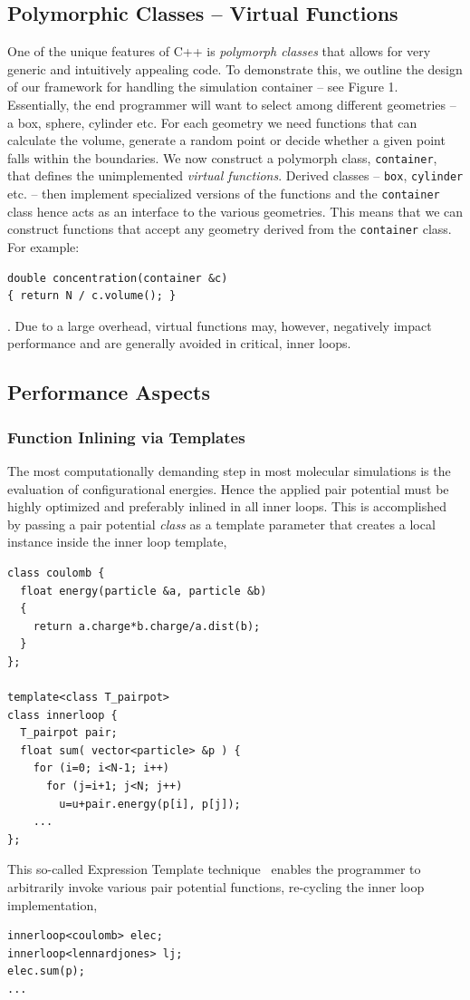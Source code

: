 \documentclass[10pt]{bmc_article}
\newenvironment{bmcformat}{\begin{raggedright}\baselineskip20pt\sloppy\setboolean{publ}{false}}{\end{raggedright}\baselineskip20pt\sloppy}
\begin{document}
\begin{bmcformat}
\subsection*{Polymorphic Classes -- Virtual Functions}
One of the unique features of C++ is \emph{polymorph classes} that allows for very generic and intuitively appealing code.
To demonstrate this, we outline the design of our framework for handling the simulation container -- see Figure 1.
Essentially, the end programmer will want to select among different geometries -- a box, sphere, cylinder etc.
For each geometry we need functions that can calculate the volume, generate a random point or decide whether a given point falls within the boundaries.
We now construct a polymorph class, \verb"container", that defines the unimplemented \emph{virtual functions}.
Derived classes -- \verb"box", \verb"cylinder" etc. -- then implement specialized versions of the functions and the \verb"container" class hence acts as an interface to the various geometries.
This means that we can construct functions that accept any geometry derived from the \verb"container" class.
For example:
\begin{verbatim}
double concentration(container &c)
{ return N / c.volume(); }
\end{verbatim}.
Due to a large overhead, virtual functions may, however, negatively impact performance and are generally avoided in critical, inner loops.

\subsection*{Performance Aspects}
\subsubsection*{Function Inlining via Templates}
The most computationally demanding step in most molecular simulations is the evaluation of configurational energies.
Hence the applied pair potential must be highly optimized and preferably inlined in all inner loops.
This is accomplished by passing a pair potential \emph{class} as a template parameter that creates a local instance inside the inner loop template,
\begin{verbatim}
class coulomb {
  float energy(particle &a, particle &b)
  {
    return a.charge*b.charge/a.dist(b);
  }
};

template<class T_pairpot>
class innerloop {
  T_pairpot pair;
  float sum( vector<particle> &p ) {
    for (i=0; i<N-1; i++)
      for (j=i+1; j<N; j++) 
        u=u+pair.energy(p[i], p[j]);
    ...
};
\end{verbatim}
This so-called Expression Template technique~\cite{veldhuizen:95} enables the programmer to arbitrarily invoke various pair potential functions, re-cycling the inner loop implementation,
\begin{verbatim}
innerloop<coulomb> elec;
innerloop<lennardjones> lj;
elec.sum(p);
...
\end{verbatim}


\end{bmcformat}
\end{document}
